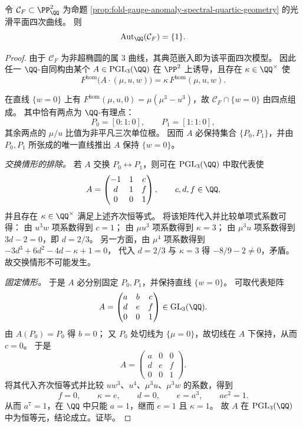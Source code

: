 
\begin{theorem}\label{thm:fold-gauge-anomaly-spectral-quartic-autQ-trivial}
令 \(\mathcal C_F\subset\PP^2_{\QQ}\) 为命题 \ref{prop:fold-gauge-anomaly-spectral-quartic-geometry} 的光滑平面四次曲线。
则
\[
\operatorname{Aut}_{\QQ}(\mathcal C_F)=\{1\}.
\]
\end{theorem}
\begin{proof}
由于 \(\mathcal C_F\) 为非超椭圆的属 \(3\) 曲线，其典范嵌入即为该平面四次模型。
因此任一 \(\QQ\)-自同构由某个 \(A\in\mathrm{PGL}_3(\QQ)\) 在 \(\PP^2\) 上诱导，且存在 \(\kappa\in\QQ^\times\) 使
\[
F^{\mathrm{hom}}\!\bigl(A\cdot(\mu,u,w)\bigr)=\kappa\,F^{\mathrm{hom}}(\mu,u,w).
\]
\par
在直线 \(\{w=0\}\) 上有 \(F^{\mathrm{hom}}(\mu,u,0)=\mu(\mu^3-u^3)\)，故 \(\mathcal C_F\cap\{w=0\}\) 由四点组成。
其中恰有两点为 \(\QQ\)-有理点：
\[
P_0=[0:1:0],\qquad P_1=[1:1:0],
\]
其余两点的 \(\mu/u\) 比值为非平凡三次单位根。
因而 \(A\) 必保持集合 \(\{P_0,P_1\}\)，并由 \(P_0,P_1\) 所张成的唯一直线推出 \(A\) 保持 \(\{w=0\}\)。
\par
\emph{交换情形的排除。}
若 \(A\) 交换 \(P_0\leftrightarrow P_1\)，则可在 \(\mathrm{PGL}_3(\QQ)\) 中取代表使
\[
A=
\begin{pmatrix}
-1&1&c\\
d&1&f\\
0&0&1
\end{pmatrix},
\qquad c,d,f\in\QQ,
\]
并且存在 \(\kappa\in\QQ^\times\) 满足上述齐次恒等式。
将该矩阵代入并比较单项式系数可得：
由 \(u^{3}w\) 项系数得到 \(c=1\)；
由 \(\mu u^{3}\) 项系数得到 \(\kappa=3\)；
由 \(\mu^{3}u\) 项系数得到 \(3d-2=0\)，即 \(d=2/3\)。
另一方面，由 \(\mu^4\) 项系数得到
\(
-3d^{3}+6d^{2}-4d-\kappa+1=0
\)，
代入 \(d=2/3\) 与 \(\kappa=3\) 得 \(-8/9-2\neq 0\)，矛盾。
故交换情形不可能发生。
\par
\emph{固定情形。}
于是 \(A\) 必分别固定 \(P_0,P_1\)，并保持直线 \(\{w=0\}\)。
可取代表矩阵
\[
A=
\begin{pmatrix}
a& b& c\\
d& e& f\\
0& 0& 1
\end{pmatrix}\in\mathrm{GL}_3(\QQ).
\]
由 \(A(P_0)=P_0\) 得 \(b=0\)；
又 \(P_0\) 处切线为 \(\{\mu=0\}\)，故切线在 \(A\) 下保持，从而 \(c=0\)。
于是
\[
A=
\begin{pmatrix}
a& 0& 0\\
d& e& f\\
0& 0& 1
\end{pmatrix}.
\]
将其代入齐次恒等式并比较 \(uw^{3}\)、\(u^{4}\)、\(\mu^{3}u\)、\(\mu^{3}w\) 的系数，得到
\[
f=0,\qquad \kappa=e,\qquad d=0,\qquad e=a^{3},\qquad a e^{2}=1.
\]
从而 \(a^{7}=1\)，在 \(\QQ\) 中只能 \(a=1\)，继而 \(e=1\) 且 \(\kappa=1\)。
故 \(A\) 在 \(\mathrm{PGL}_3(\QQ)\) 中为恒等元，结论成立。证毕。
\end{proof}

\endinput
